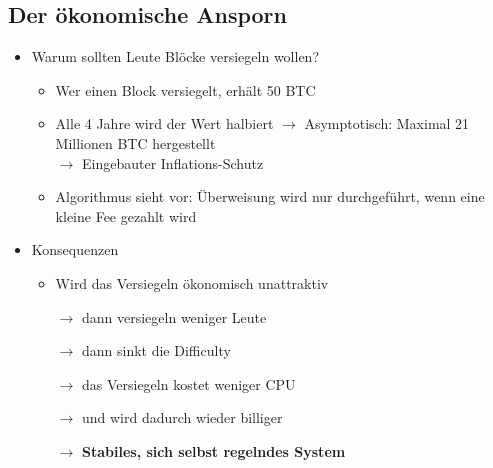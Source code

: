 \documentclass{article} %
\begin{document}
	\subsection{Der ökonomische Ansporn}
		\begin{itemize}
			\item Warum sollten Leute Blöcke versiegeln wollen?
			\begin{itemize}
				\item Wer einen Block versiegelt, erhält 50 BTC
				\item Alle 4 Jahre wird der Wert halbiert $\rightarrow$ Asymptotisch: Maximal 21 Millionen BTC hergestellt\\				
				$\rightarrow$ Eingebauter Inflations-Schutz
				\item Algorithmus sieht vor: Überweisung wird nur durchgeführt, wenn eine kleine Fee gezahlt wird
			\end{itemize}
			\item Konsequenzen
			\begin{itemize}
				\item Wird das Versiegeln ökonomisch unattraktiv
				\item[$\rightarrow$] dann versiegeln weniger Leute
				\item[$\rightarrow$] dann sinkt die Difficulty
				\item[$\rightarrow$] das Versiegeln kostet weniger CPU
				\item[$\rightarrow$] und wird dadurch wieder billiger
				\item[$\rightarrow$]\textbf{Stabiles, sich selbst regelndes System}
			\end{itemize}
			\end{itemize}
			
\end{document}
